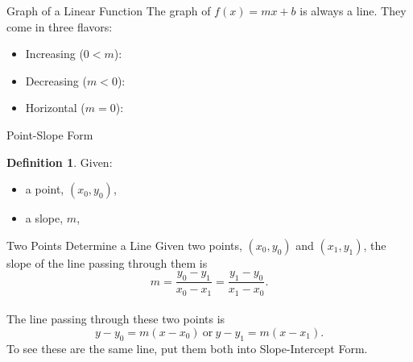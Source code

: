 \documentclass{beamer}
\theoremstyle{definition}
\newtheorem{defn}{Definition}
\begin{document}
\begin{frame}{Graph of a Linear Function}
  The graph of $f(x) = mx + b$ is always a line.
  \pause
  They come in three flavors:
  \begin{itemize}
    \item<3->
      Increasing ($0 < m$):
      \begin{center}
      \end{center}
    \item<4->
      Decreasing ($m < 0$):
      \begin{center}
      \end{center}
    \item<5->
      Horizontal ($m = 0$):
      \begin{center}
      \end{center}
  \end{itemize}
  
\end{frame}

\begin{frame}{Point-Slope Form}
  \begin{defn}
    Given: 
    \begin{itemize}
    \item<2->
      a point, $(x_0, y_0)$,
    \item<3->
      a slope, $m$,
    \end{itemize}
  \end{defn}
\end{frame}

\begin{frame}{Two Points Determine a Line}
  Given two points, $(x_0, y_0)$ and $(x_1, y_1)$, the slope of the line passing through them is
  $$m = \frac{y_0 - y_1}{x_0 - x_1} = \frac{y_1 - y_0}{x_1 - x_0}.$$\\
  \pause
  The line passing through these two points is
  $$ y - y_0 = m(x - x_0)\ \text{or}\ y - y_1 = m(x - x_1).$$
  \pause
  To see these are the same line, put them both into Slope-Intercept Form.
\end{frame}
\end{document}
